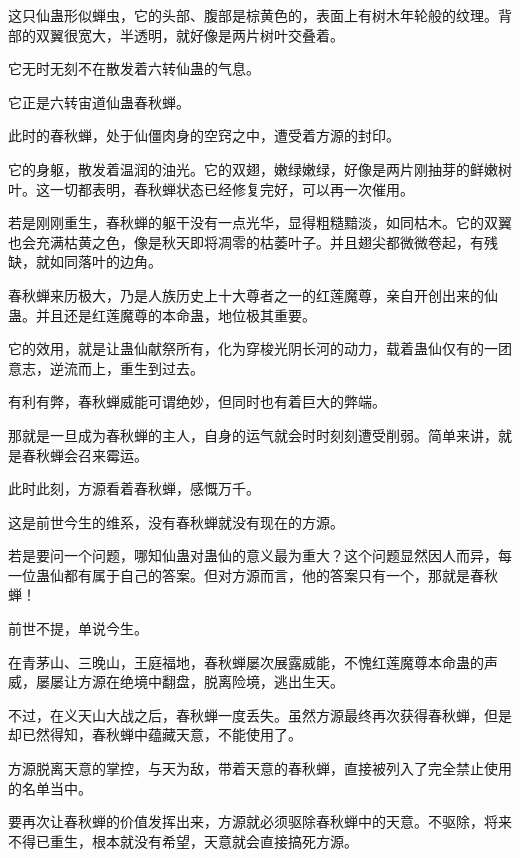 
\begin{this_body}



这只仙蛊形似蝉虫，它的头部、腹部是棕黄色的，表面上有树木年轮般的纹理。背部的双翼很宽大，半透明，就好像是两片树叶交叠着。

它无时无刻不在散发着六转仙蛊的气息。

它正是六转宙道仙蛊春秋蝉。

此时的春秋蝉，处于仙僵肉身的空窍之中，遭受着方源的封印。

它的身躯，散发着温润的油光。它的双翅，嫩绿嫩绿，好像是两片刚抽芽的鲜嫩树叶。这一切都表明，春秋蝉状态已经修复完好，可以再一次催用。

若是刚刚重生，春秋蝉的躯干没有一点光华，显得粗糙黯淡，如同枯木。它的双翼也会充满枯黄之色，像是秋天即将凋零的枯萎叶子。并且翅尖都微微卷起，有残缺，就如同落叶的边角。

春秋蝉来历极大，乃是人族历史上十大尊者之一的红莲魔尊，亲自开创出来的仙蛊。并且还是红莲魔尊的本命蛊，地位极其重要。

它的效用，就是让蛊仙献祭所有，化为穿梭光阴长河的动力，载着蛊仙仅有的一团意志，逆流而上，重生到过去。

有利有弊，春秋蝉威能可谓绝妙，但同时也有着巨大的弊端。

那就是一旦成为春秋蝉的主人，自身的运气就会时时刻刻遭受削弱。简单来讲，就是春秋蝉会召来霉运。

此时此刻，方源看着春秋蝉，感慨万千。

这是前世今生的维系，没有春秋蝉就没有现在的方源。

若是要问一个问题，哪知仙蛊对蛊仙的意义最为重大？这个问题显然因人而异，每一位蛊仙都有属于自己的答案。但对方源而言，他的答案只有一个，那就是春秋蝉！

前世不提，单说今生。

在青茅山、三晚山，王庭福地，春秋蝉屡次展露威能，不愧红莲魔尊本命蛊的声威，屡屡让方源在绝境中翻盘，脱离险境，逃出生天。

不过，在义天山大战之后，春秋蝉一度丢失。虽然方源最终再次获得春秋蝉，但是却已然得知，春秋蝉中蕴藏天意，不能使用了。

方源脱离天意的掌控，与天为敌，带着天意的春秋蝉，直接被列入了完全禁止使用的名单当中。

要再次让春秋蝉的价值发挥出来，方源就必须驱除春秋蝉中的天意。不驱除，将来不得已重生，根本就没有希望，天意就会直接搞死方源。


\end{this_body}
